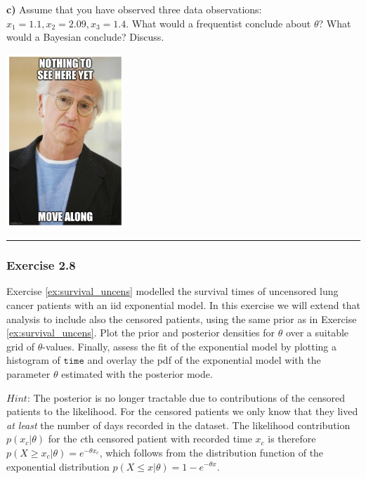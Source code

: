 \documentclass[
  letterpaper,
  DIV=11,
  numbers=noendperiod]{scrartcl}
\begin{document}
\textbf{c)} Assume that you have observed three data observations:
\(x_1 = 1.1, x_2 = 2.09, x_3 = 1.4\). What would a frequentist conclude
about \(\theta\)? What would a Bayesian conclude? Discuss.

\begin{tcolorbox}[enhanced jigsaw, coltitle=black, breakable, colbacktitle=quarto-callout-note-color!10!white, colframe=quarto-callout-note-color-frame, bottomrule=.15mm, toprule=.15mm, rightrule=.15mm, arc=.35mm, colback=white, opacityback=0, bottomtitle=1mm, leftrule=.75mm, title={Solution}, titlerule=0mm, toptitle=1mm, left=2mm, opacitybacktitle=0.6]

\includegraphics[width=1.73958in,height=\textheight,keepaspectratio]{../exercises/larry.png}

\end{tcolorbox}

\begin{center}\rule{0.5\linewidth}{0.5pt}\end{center}

\subsubsection{Exercise 2.8}\label{exercise-2.8}

Exercise \ref{ex:survival_uncens} modelled the survival times of
uncensored lung cancer patients with an iid exponential model. In this
exercise we will extend that analysis to include also the censored
patients, using the same prior as in Exercise \ref{ex:survival_uncens}.
Plot the prior and posterior densities for \(\theta\) over a suitable
grid of \(\theta\)-values. Finally, assess the fit of the exponential
model by plotting a histogram of \(\texttt{time}\) and overlay the pdf
of the exponential model with the parameter \(\theta\) estimated with
the posterior mode.

\(\textit{Hint}\): The posterior is no longer tractable due to
contributions of the censored patients to the likelihood. For the
censored patients we only know that they lived \emph{at least} the
number of days recorded in the dataset. The likelihood contribution
\(p(x_c \vert \theta)\) for the \(c\)th censored patient with recorded
time \(x_c\) is therefore
\(p(X \geq x_c \vert \theta) = e^{-\theta x_c}\), which follows from the
distribution function of the exponential distribution
\(p(X \leq x \vert \theta) = 1 - e^{-\theta x}\).
\end{document}
